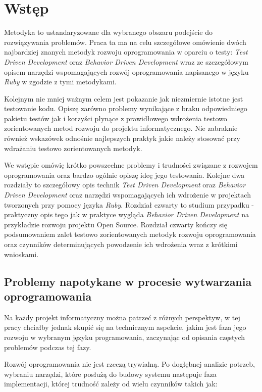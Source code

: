 
\nocite{ruby_way}
\nocite{rails_guides}
\nocite{polish_ruby_forum}

\chapter[Wstęp]{Wstęp}
  Metodyka to ustandaryzowane dla wybranego obszaru podejście do rozwiązywania problemów. Praca ta ma na celu szczegółowe omówienie dwóch najbardziej znanych metodyk rozwoju oprogramowania w oparciu o testy: \emph{Test Driven Development} oraz \emph{Behavior Driven Development} wraz ze szczegółowym opisem narzędzi wspomagających rozwój oprogramowania napisanego w języku \emph{Ruby} w zgodzie z tymi metodykami.
  
  Kolejnym nie mniej ważnym celem jest pokazanie jak niezmiernie istotne jest testowanie kodu. Opiszę zarówno problemy wynikające z braku odpowiedniego pakietu testów jak i korzyści płynące z prawidłowego wdrożenia testowo zorientowanych metod rozwoju do projektu informatycznego. Nie zabraknie również wskazówek odnośnie najlepszych praktyk jakie należy stosować przy wdrażaniu testowo zorientowanych metodyk.
  
  We wstępie omówię krótko powszechne problemy i trudności związane z rozwojem oprogramowania oraz bardzo ogólnie opiszę ideę jego testowania. Kolejne dwa rozdziały to szczegółowy opis technik \emph{Test Driven Development} oraz \emph{Behavior Driven Development} oraz narzędzi wspomagających ich wdrożenie w projektach tworzonych przy pomocy języka \emph{Ruby}. Rozdział czwarty to studium przypadku - praktyczny opis tego jak w praktyce wygląda \emph{Behavior Driven Development} na przykładzie rozwoju projektu Open Source. Rozdział czwarty kończy się podsumowaniem zalet testowo zorientowanych metodyk rozwoju oprogramowania oraz czynników determinujących powodzenie ich wdrożenia wraz z krótkimi wnioskami.
  
	\section{Problemy napotykane w procesie wytwarzania oprogramowania}
	  Na każdy projekt informatyczny można patrzeć z różnych perspektyw, w tej pracy chciałby jednak skupić się na technicznym aspekcie, jakim jest faza jego rozwoju w wybranym języku programowania, zaczynając od opisania częstych problemów podczas tej fazy.
	  
	  Rozwój oprogramowania nie jest rzeczą trywialną. Po dogłębnej analizie potrzeb, wybraniu narzędzi, które posłużą do budowy systemu następuje faza implementacji, której trudność zależy od wielu czynników takich jak:
	  
